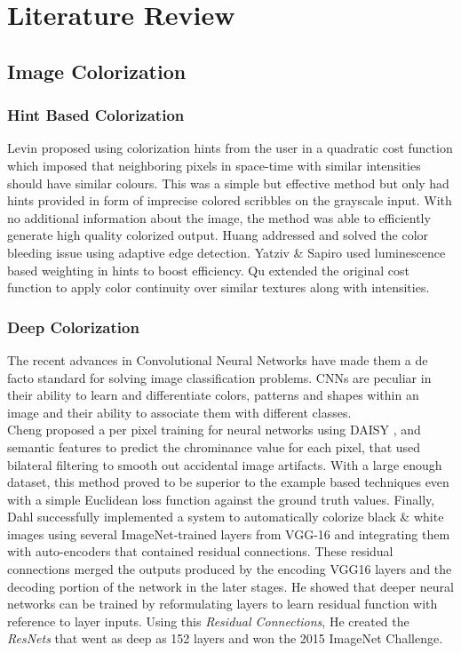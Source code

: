 \documentclass[10pt,twocolumn,letterpaper]{article}
\begin{document}
\section{Literature Review}
\subsection{Image Colorization}
\subsubsection{Hint Based Colorization}
\hspace*{0.167 in}Levin \etal\cite{levin2004colorization} proposed using colorization hints from the user in a quadratic cost function which imposed that neighboring pixels in space-time with similar intensities should have similar colours. This was a simple but effective method but only had hints provided in form of imprecise colored scribbles on the grayscale input. With no additional information about the image, the method was able to efficiently generate high quality colorized output. Huang \etal\cite{huang2005edge} addressed and solved the color bleeding issue using adaptive edge detection. Yatziv \& Sapiro\cite{yatziv2006chrominance} used luminescence based weighting in hints to boost efficiency. Qu \etal\cite{qu2006manga} extended the original cost function to apply color continuity over similar textures along with intensities.
\subsubsection{Deep Colorization}
\hspace*{0.167 in}The recent advances in Convolutional Neural Networks have made them a de facto standard for solving image classification problems. CNNs are peculiar in their ability to learn and differentiate colors, patterns and shapes within an image and their ability to associate them with different classes.\\
\hspace*{0.167 in}Cheng \etal\cite{cheng2016deep} proposed a per pixel training for neural networks using DAISY \cite{tola2008descriptor}, and semantic \cite{long2015semantic} features to predict the chrominance value for each pixel, that used bilateral filtering to smooth out accidental image artifacts. With a large enough dataset, this method proved to be superior to the example based techniques even with a simple Euclidean loss function against the ground truth values. Finally, Dahl\cite{dahl2016automatic} successfully implemented a system to automatically colorize black \& white images using several ImageNet-trained layers from VGG-16 \cite{simonyan2015deep} and integrating them with auto-encoders that contained residual connections. These residual connections merged the outputs produced by the encoding VGG16 layers and the decoding portion of the network in the later stages. He \etal\cite{he2015deep} showed that deeper neural networks can be trained by reformulating layers to learn residual function with reference to layer inputs. Using this \textit{Residual Connections}, He \etal\cite{he2015deep} created the \textit{ResNets} that went as deep as 152 layers and won the 2015 ImageNet Challenge.
\end{document}
